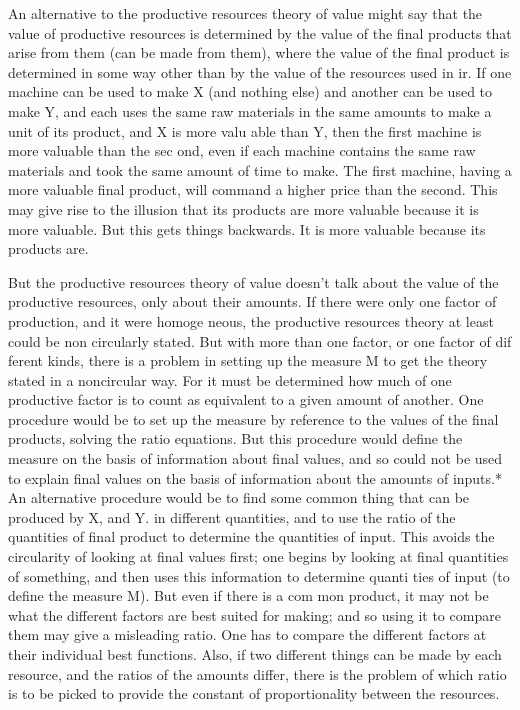 \documentclass[11pt,openany]{book}
\begin{document}
An alternative to the productive resources theory of value might say that the value of productive resources is determined by the value of the final products that arise from them (can be made from them), where the value of the final product is determined in some way other than by the value of the resources used in ir. If one machine can be used to make X (and nothing else) and another can be used to make Y, and each uses the same raw materials in the same amounts to make a unit of its product, and X is more valu able than Y, then the first machine is more valuable than the sec ond, even if each machine contains the same raw materials and took the same amount of time to make. The first machine, having a more valuable final product, will command a higher price than the second. This may give rise to the illusion that its products are more valuable because it is more valuable. But this gets things backwards. It is more valuable because its products are. 

But the productive resources theory of value doesn't talk about the value of the productive resources, only about their amounts. If there were only one factor of production, and it were homoge neous, the productive resources theory at least could be non circularly stated. But with more than one factor, or one factor of dif ferent kinds, there is a problem in setting up the measure M to get the theory stated in a noncircular way. For it must be determined how much of one productive factor is to count as equivalent to a given amount of another. One procedure would be to set up the measure by reference to the values of the final products, solving the ratio equations. But this procedure would define the measure on the basis of information about final values, and so could not be used to explain final values on the basis of information about the amounts of inputs.* An alternative procedure would be to find some common thing that can be produced by X, and Y. in different quantities, and to use the ratio of the quantities of final product to determine the quantities of input. This avoids the circularity of looking at final values first; one begins by looking at final quantities of something, and then uses this information to determine quanti ties of input (to define the measure M). But even if there is a com mon product, it may not be what the different factors are best suited for making; and so using it to compare them may give a misleading ratio. One has to compare the different factors at their individual best functions. Also, if two different things can be made by each resource, and the ratios of the amounts differ, there is the problem of which ratio is to be picked to provide the constant of proportionality between the resources. 
\end{document}
